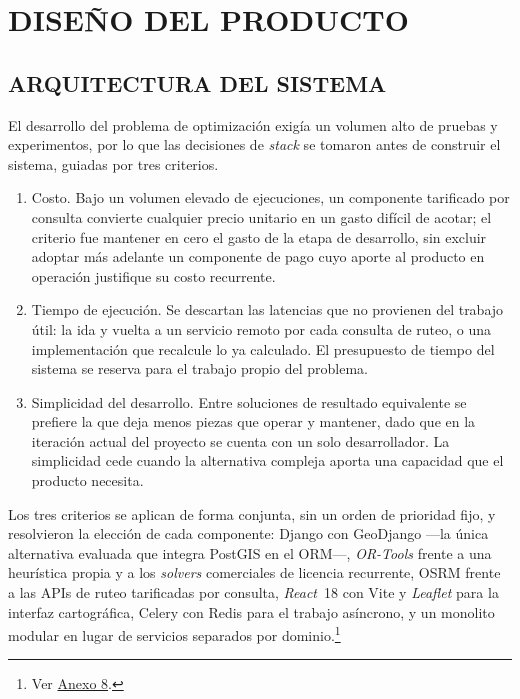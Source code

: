 \chapter{DISEÑO DEL PRODUCTO}
\label{cap:diseno}

\section{ARQUITECTURA DEL SISTEMA}
\label{sec:arquitectura}
El desarrollo del problema de optimización exigía un volumen alto de pruebas y experimentos, por lo
que las decisiones de \textit{stack} se tomaron antes de construir el sistema, guiadas por tres
criterios.

\begin{enumerate}
  \item Costo. Bajo un volumen elevado de ejecuciones, un componente tarificado por consulta
        convierte cualquier precio unitario en un gasto difícil de acotar; el criterio fue mantener
        en cero el gasto de la etapa de desarrollo, sin excluir adoptar más adelante un componente
        de pago cuyo aporte al producto en operación justifique su costo recurrente.
  \item Tiempo de ejecución. Se descartan las latencias que no provienen del trabajo útil: la ida y
        vuelta a un servicio remoto por cada consulta de ruteo, o una implementación que recalcule
        lo ya calculado. El presupuesto de tiempo del sistema se reserva para el trabajo propio del
        problema.
  \item Simplicidad del desarrollo. Entre soluciones de resultado equivalente se prefiere la que
        deja menos piezas que operar y mantener, dado que en la iteración actual del proyecto se
        cuenta con un solo desarrollador. La simplicidad cede cuando la alternativa compleja aporta
        una capacidad que el producto necesita.
\end{enumerate}

Los tres criterios se aplican de forma conjunta, sin un orden de prioridad fijo, y resolvieron la
elección de cada componente: Django con GeoDjango ---la única alternativa evaluada que integra
PostGIS en el ORM---, \textit{OR-Tools} frente a una heurística propia y a los \textit{solvers}
comerciales de licencia recurrente, OSRM frente a las APIs de ruteo tarificadas por consulta,
\textit{React}~18 \citep{react} con Vite y \textit{Leaflet} \citep{leaflet} para la interfaz
cartográfica, Celery con Redis para el trabajo asíncrono, y un monolito modular en lugar de
servicios separados por dominio.\footnote{Ver \hyperref[anx:stack]{Anexo 8}.} 

